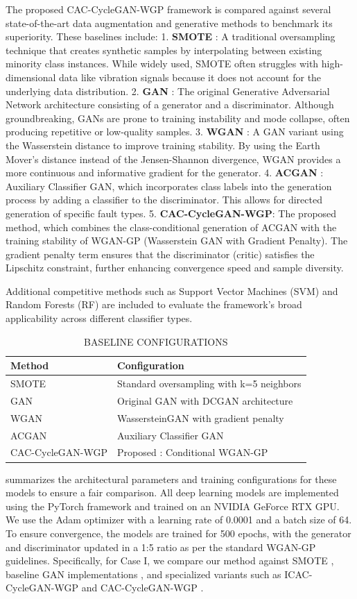 \documentclass[twocolumn]{IEEEtran}
\begin{document}
The proposed CAC-CycleGAN-WGP framework is compared against several state-of-the-art data augmentation and generative methods to benchmark its superiority. These baselines include:
1. \textbf{SMOTE} \cite{6}: A traditional oversampling technique that creates synthetic samples by interpolating between existing minority class instances. While widely used, SMOTE often struggles with high-dimensional data like vibration signals because it does not account for the underlying data distribution.
2. \textbf{GAN} \cite{1}: The original Generative Adversarial Network architecture consisting of a generator and a discriminator. Although groundbreaking, GANs are prone to training instability and mode collapse, often producing repetitive or low-quality samples.
3. \textbf{WGAN} \cite{2}: A GAN variant using the Wasserstein distance to improve training stability. By using the Earth Mover's distance instead of the Jensen-Shannon divergence, WGAN provides a more continuous and informative gradient for the generator.
4. \textbf{ACGAN} \cite{5}: Auxiliary Classifier GAN, which incorporates class labels into the generation process by adding a classifier to the discriminator. This allows for directed generation of specific fault types.
5. \textbf{CAC-CycleGAN-WGP}: The proposed method, which combines the class-conditional generation of ACGAN with the training stability of WGAN-GP (Wasserstein GAN with Gradient Penalty). The gradient penalty term ensures that the discriminator (critic) satisfies the Lipschitz constraint, further enhancing convergence speed and sample diversity.

Additional competitive methods such as Support Vector Machines (SVM) \cite{Cortes1995} and Random Forests (RF) \cite{Breiman2001} are included to evaluate the framework's broad applicability across different classifier types. \begin{table}[htbp]
\centering
\caption{BASELINE CONFIGURATIONS}
\label{tab:baselines}
\begin{tabular}{ll}
\hline
Method & Configuration \\
\hline
SMOTE & Standard oversampling with k=5 neighbors \\
GAN & Original GAN with DCGAN architecture \\
WGAN & WassersteinGAN with gradient penalty \\
ACGAN & Auxiliary Classifier GAN \\
CAC-CycleGAN-WGP & Proposed : Conditional WGAN-GP \\
\hline
\end{tabular}
\end{table} summarizes the architectural parameters and training configurations for these models to ensure a fair comparison. All deep learning models are implemented using the PyTorch framework and trained on an NVIDIA GeForce RTX GPU. We use the Adam optimizer \cite{Kingma2015} with a learning rate of 0.0001 and a batch size of 64. To ensure convergence, the models are trained for 500 epochs, with the generator and discriminator updated in a 1:5 ratio as per the standard WGAN-GP guidelines. Specifically, for Case I, we compare our method against SMOTE \cite{6}, baseline GAN implementations \cite{1}, and specialized variants such as ICAC-CycleGAN-WGP \cite{26} and CAC-CycleGAN-WGP \cite{35}.
\end{document}
